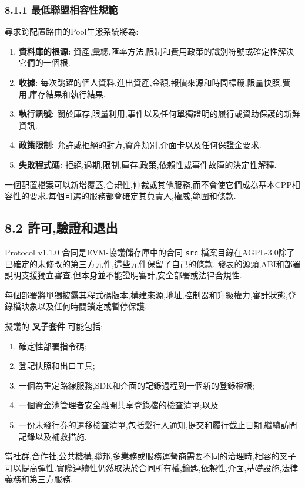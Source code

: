 \documentclass[11pt]{article}
\begin{document}
\subsubsection*{8.1.1 最低聯盟相容性規範}

尋求跨配置路由的Pool生態系統將為:

\begin{enumerate}[leftmargin=*]
\item \textbf{資料庫的根源:} 資產,彙總,匯率方法,限制和費用政策的識別符號或確定性解決它們的一個根.
\item \textbf{收據:} 每次跳躍的個人資料,進出資產,金額,報價來源和時間標籤,限量快照,費用,庫存結果和執行結果.
\item \textbf{執行訊號:} 關於庫存,限量利用,事件以及任何單獨證明的履行或資助保護的新鮮資訊.
\item \textbf{政策限制:} 允許或拒絕的對方,資產類別,介面卡以及任何保證金要求.
\item \textbf{失敗程式碼:} 拒絕,過期,限制,庫存,政策,依賴性或事件故障的決定性解釋.
\end{enumerate}
一個配置檔案可以新增覆蓋,合規性,仲裁或其他服務,而不會使它們成為基本CPP相容性的要求.每個可選的服務都會確定其負責人,權威,範圍和條款.

\subsection*{8.2 許可,驗證和退出}

Protocol v1.1.0 合同是EVM-協議儲存庫中的合同 \texttt{src} 檔案目錄在AGPL-3.0除了已確定的未修改的第三方元件,這些元件保留了自己的條款. 發表的源頭,ABI和部署說明支援獨立審查,但本身並不能證明審計,安全部署或法律合規性.

每個部署將單獨披露其程式碼版本,構建來源,地址,控制器和升級權力,審計狀態,登錄檔映象以及任何時間鎖定或暫停保護.

擬議的 \textbf{叉子套件} 可能包括:

\begin{enumerate}[leftmargin=*]
\item 確定性部署指令碼;
\item 登記快照和出口工具;
\item 一個為重定路線服務,SDK和介面的記錄過程到一個新的登錄檔根;
\item 一個資金池管理者安全離開共享登錄檔的檢查清單;以及
\item 一份未發行券的遷移檢查清單,包括髮行人通知,提交和履行截止日期,繼續訪問記錄以及補救措施.
\end{enumerate}
當社群,合作社,公共機構,聯邦,多業務或服務運營商需要不同的治理時,相容的叉子可以提高彈性.實際連續性仍然取決於合同所有權,鑰匙,依賴性,介面,基礎設施,法律義務和第三方服務.
\end{document}
